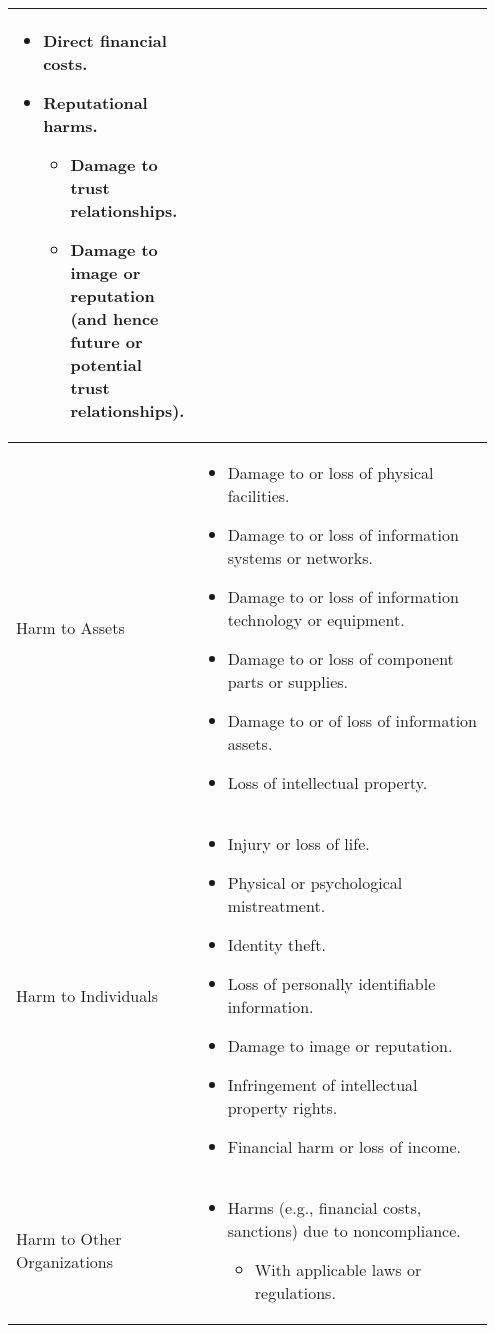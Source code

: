 \documentclass[fleqn]{article}
\begin{document}
\begin{table}[H]
\begin{tabular}{|m{0.20\linewidth} | m{0.75\linewidth}|}
\begin{itemize}[noitemsep]
\begin{itemize}
			\end{itemize}
			\item Direct financial costs.
			\item Reputational harms.	
			\begin{itemize}[noitemsep,nolistsep]
				\item Damage to trust relationships.
				\item Damage to image or reputation (and hence future or potential trust relationships).
			\end{itemize}
		\end{itemize} \\
		\hline
		Harm to Assets & 
		\begin{itemize}[noitemsep]
			\item Damage to or loss of physical facilities.
			\item Damage to or loss of information systems or networks.
			\item Damage to or loss of information technology or equipment.
			\item Damage to or loss of component parts or supplies.
			\item Damage to or of loss of information assets.
			\item Loss of intellectual property.            	
		\end{itemize} \\
		\hline
		Harm to Individuals & 
		\begin{itemize}[noitemsep]
			\item Injury or loss of life.
			\item Physical or psychological mistreatment.
			\item Identity theft.
			\item Loss of personally identifiable information.
			\item Damage to image or reputation.
			\item Infringement of intellectual property rights.
			\item Financial harm or loss of income.	
		\end{itemize} \\            
		\hline
		Harm to Other Organizations & 
		\begin{itemize}[noitemsep]
			\item Harms (e.g., financial costs, sanctions) due to noncompliance. 
			\begin{itemize}[noitemsep,nolistsep]
				\item With applicable laws or regulations.

\end{itemize}
\end{itemize}
\end{tabular}
\end{table}
\end{document}
